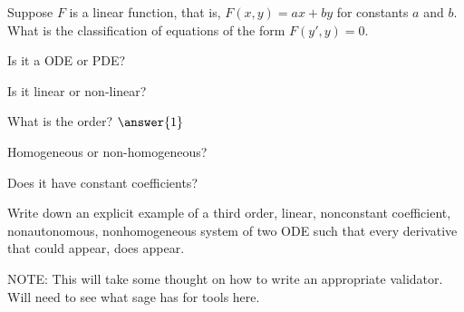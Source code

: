 \documentclass{ximera}
\begin{document}
\begin{exercise}
    Suppose $F$ is a linear function, that is, $F(x,y) = ax+by$ for constants $a$ and $b$.  What is the classification of equations of the form $F(y',y) = 0$.

    Is it a ODE or PDE?
    \begin{multipleChoice}
    \end{multipleChoice}
    
    \begin{problem}
        Is it linear or non-linear?
        \begin{multipleChoice}
        \end{multipleChoice}
        
        \begin{problem}
            What is the order? $\answer{1}$
            
            \begin{problem}
                Homogeneous or non-homogeneous?
                \begin{multipleChoice}
                \end{multipleChoice}

                \begin{problem}
                    Does it have constant coefficients?
                    \begin{multipleChoice}
                    \end{multipleChoice}
                \end{problem}
            \end{problem}
        \end{problem}
    \end{problem}

\end{exercise}

\begin{exercise}
    Write down an explicit example of a third order, linear, nonconstant coefficient, nonautonomous, nonhomogeneous system of two ODE such that every derivative that could appear, does appear.
    
    NOTE: This will take some thought on how to write an appropriate validator. Will need to see what sage has for tools here.
\end{exercise}
\end{document}
